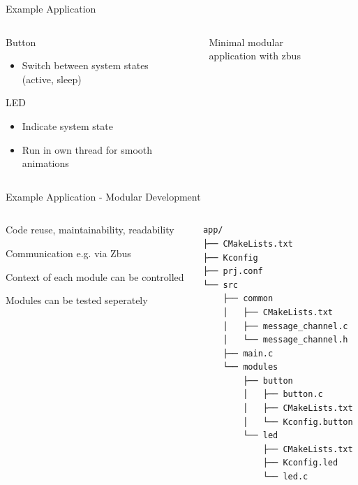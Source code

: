 \documentclass[10pt, aspectratio=169]{beamer}
\begin{document}
\begin{frame}[fragile]{Example Application}
  \begin{columns}
    \begin{column}{0.6\textwidth}
    Button
    \begin{itemize}
      \item Switch between system states (active, sleep)
    \end{itemize}

    LED
    \begin{itemize}
      \item Indicate system state
      \item Run in own thread for smooth animations
    \end{itemize}
    \end{column}
    \begin{column}{0.4\textwidth}
      \begin{figure}
       
        \caption*{Minimal modular application with zbus}
      \end{figure}
    \end{column}
  \end{columns}
\end{frame}
\begin{frame}[fragile]{Example Application - Modular Development}
  \begin{columns}
    \begin{column}{0.6\textwidth}
      \begin{description}
        \item [General] Code reuse, maintainability, readability
	\item [IPC] Communication e.g. via Zbus
	\item Context of each module can be controlled
	\item [Testing] Modules can be tested seperately
      \end{description}
    \end{column}
    \begin{column}{0.4\textwidth}
        {\fontsize{6}{6}\selectfont
          \begin{verbatim}
app/
├── CMakeLists.txt
├── Kconfig
├── prj.conf
└── src
    ├── common
    │   ├── CMakeLists.txt
    │   ├── message_channel.c
    │   └── message_channel.h
    ├── main.c
    └── modules
        ├── button
        │   ├── button.c
        │   ├── CMakeLists.txt
        │   └── Kconfig.button
        └── led
            ├── CMakeLists.txt
            ├── Kconfig.led
            └── led.c
          \end{verbatim}
        }
    \end{column}
  \end{columns}
\end{frame}
\end{document}
